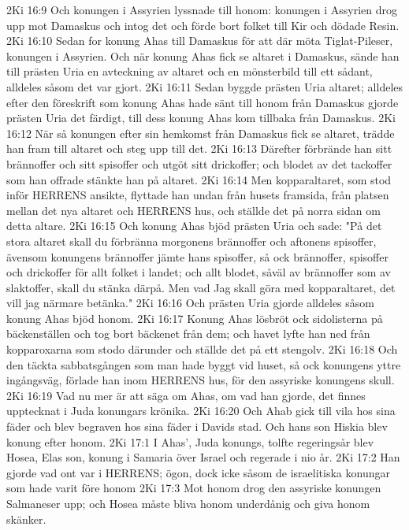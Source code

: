 2Ki 16:9  Och konungen i Assyrien lyssnade till honom: konungen i Assyrien drog upp mot Damaskus och intog det och förde bort folket till Kir och dödade Resin.
2Ki 16:10  Sedan for konung Ahas till Damaskus för att där möta Tiglat-Pileser, konungen i Assyrien. Och när konung Ahas fick se altaret i Damaskus, sände han till prästen Uria en avteckning av altaret och en mönsterbild till ett sådant, alldeles såsom det var gjort.
2Ki 16:11  Sedan byggde prästen Uria altaret; alldeles efter den föreskrift som konung Ahas hade sänt till honom från Damaskus gjorde prästen Uria det färdigt, till dess konung Ahas kom tillbaka från Damaskus.
2Ki 16:12  När så konungen efter sin hemkomst från Damaskus fick se altaret, trädde han fram till altaret och steg upp till det.
2Ki 16:13  Därefter förbrände han sitt brännoffer och sitt spisoffer och utgöt sitt drickoffer; och blodet av det tackoffer som han offrade stänkte han på altaret.
2Ki 16:14  Men kopparaltaret, som stod inför HERRENS ansikte, flyttade han undan från husets framsida, från platsen mellan det nya altaret och HERRENS hus, och ställde det på norra sidan om detta altare.
2Ki 16:15  Och konung Ahas bjöd prästen Uria och sade: "På det stora altaret skall du förbränna morgonens brännoffer och aftonens spisoffer, ävensom konungens brännoffer jämte hans spisoffer, så ock brännoffer, spisoffer och drickoffer för allt folket i landet; och allt blodet, såväl av brännoffer som av slaktoffer, skall du stänka därpå. Men vad Jag skall göra med kopparaltaret, det vill jag närmare betänka."
2Ki 16:16  Och prästen Uria gjorde alldeles såsom konung Ahas bjöd honom.
2Ki 16:17  Konung Ahas lösbröt ock sidolisterna på bäckenställen och tog bort bäckenet från dem; och havet lyfte han ned från kopparoxarna som stodo därunder och ställde det på ett stengolv.
2Ki 16:18  Och den täckta sabbatsgången som man hade byggt vid huset, så ock konungens yttre ingångsväg, förlade han inom HERRENS hus, för den assyriske konungens skull.
2Ki 16:19  Vad nu mer är att säga om Ahas, om vad han gjorde, det finnes upptecknat i Juda konungars krönika.
2Ki 16:20  Och Ahab gick till vila hos sina fäder och blev begraven hos sina fäder i Davids stad. Och hans son Hiskia blev konung efter honom.
2Ki 17:1  I Ahas', Juda konungs, tolfte regeringsår blev Hosea, Elas son, konung i Samaria över Israel och regerade i nio år.
2Ki 17:2  Han gjorde vad ont var i HERRENS; ögon, dock icke såsom de israelitiska konungar som hade varit före honom
2Ki 17:3  Mot honom drog den assyriske konungen Salmaneser upp; och Hosea måste bliva honom underdånig och giva honom skänker.
